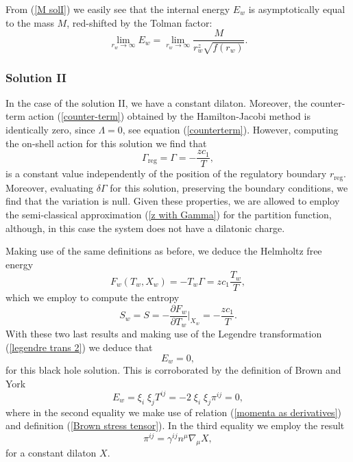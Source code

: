 \documentclass[sn-mathphys,Numbered]{sn-jnl}%
\theoremstyle{thmstyleone}%
\theoremstyle{thmstyletwo}%
\theoremstyle{thmstylethree}%
\begin{document}
From (\ref{M solI}) we easily see that the internal energy $E_w$ is asymptotically equal to the mass $M$, red-shifted by the Tolman factor:
 \begin{equation}
     \lim_{r_w \rightarrow \infty} E_w = \lim_{r_w \rightarrow \infty}  \frac{M}{r_w^z \sqrt{f(r_w)}}.
 \end{equation}


\subsubsection{Solution II} \label{section 4.2.2}

In the case of the solution II, we have a constant dilaton. Moreover, the counter-term action  (\ref{counter-term}) obtained by the Hamilton-Jacobi method is identically zero, since $\Lambda=0$, see equation (\ref{counterterm}). However, computing the on-shell action for this solution we find that
%
\begin{equation}
   \Gamma_{\text{reg}}= \Gamma=-\frac{z  c_1}{T},
\end{equation}
%
is a constant value independently of the position of the regulatory boundary $r_{\text{reg}}$. Moreover, evaluating $\delta \Gamma$ for this solution, preserving the boundary conditions, we find that the variation is null. Given these properties, we are allowed to employ the semi-classical approximation (\ref{z with Gamma}) for the partition function, although, in this case the system does not have a dilatonic charge.

Making use of the same definitions as before, we deduce the Helmholtz free energy
%
\begin{equation}
    F_w(T_w,X_w)=-T_w \Gamma=z c_1 \frac{T_w}{T},
\end{equation}
%
which we employ to compute the entropy
%
\begin{equation}
    S_w= S=-\frac{\partial F_w}{\partial T_w}\bigg\rvert_{X_w}= -\frac{z  c_1}{T}.
\end{equation}
%
With these two last results and making use of the Legendre transformation (\ref{legendre trans 2}) we deduce that 
%
\begin{equation}
    E_w=0,
\end{equation}
%
for this black hole solution. This is corroborated by the definition of Brown and York
%
\begin{equation}
    E_w= \xi_i\;\xi_j T^{ij}=-2 \; \xi_i\;\xi_j \pi ^{ij}=0,
\end{equation}
%
where in the second equality we make use of relation (\ref{momenta as derivatives}) and definition (\ref{Brown stress tensor}). In the third equality we employ the result
%
\begin{equation}
    \pi^{ij}=\gamma^{ij} n^{\mu} \nabla_{\mu} X,
\end{equation}
%
for a constant dilaton $X$.
\end{document}

